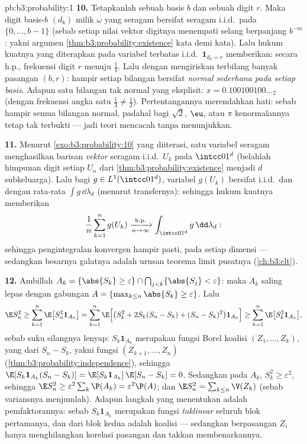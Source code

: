 \begin{solution}{pb:b3:probability:1}
\textbf{10.} Tetapkanlah sebuah basis $b$ dan sebuah digit $r$. Maka digit
basis-$b$ $(d_k)$ milik $\omega$ yang seragam bersifat seragam i.i.d.\ pada
$\{0, \dots, b-1\}$ (sebab setiap nilai vektor digitnya menempati
selang berpanjang $b^{-m}$: yakni argumen
\cref{thm:b3:probability:existence} kata demi kata). Lalu hukum
kuatnya yang diterapkan pada variabel terbatas i.i.d.\ $\mathbf
1_{d_k = r}$ memberikan: secara h.p., frekuensi digit $r$
menuju $\frac1b$. Lalu dengan mengiriskan terbilang banyak
pasangan $(b, r)$: hampir setiap bilangan bersifat
\emph{normal sederhana pada setiap basis}. Adapun satu bilangan tak normal
yang eksplisit: $x = 0.100100100\ldots_2$ (dengan frekuensi angka satu
$\frac13 \neq \frac12$). Pertentangannya merendahkan hati: sebab hampir
semua bilangan normal, padahal bagi $\sqrt2$, $\eu$, atau $\pi$
kenormalannya tetap tak terbukti --- jadi teori  mencacah
tanpa menunjukkan.

\textbf{11.} Menurut \cref{exo:b3:probability:10} yang diiterasi, satu
variabel seragam menghasilkan barisan \emph{vektor} seragam
i.i.d.\ $U_k$ pada $\intcc01^d$ (belahlah himpunan
digit setiap $U_n$ dari
\cref{thm:b3:probability:existence} menjadi $d$ subkeluarga).
Lalu bagi $g \in L^1(\intcc01^d)$, variabel $g(U_k)$ bersifat
i.i.d.\ dan  dengan rata-rata $\int g\,\dd\lambda_d$
(menurut transfernya): sehingga hukum kuatnya memberikan
\[
\frac1n\sum_{k=1}^ng(U_k)
\xrightarrow[n\to\infty]{\text{h.p.}}
\int_{\intcc01^d}g\,\dd\lambda_d :
\]
sehingga pengintegralan  konvergen hampir pasti, pada setiap
dimensi --- sedangkan besarnya galatnya adalah urusan teorema
limit pusatnya (\cref{ch:b3:clt}).

\textbf{12.} Ambillah $A_k = \{\abs{S_k} \geq \varepsilon\} \cap
\bigcap_{j<k}\{\abs{S_j} < \varepsilon\}$: maka $A_k$ saling
lepas dengan gabungan $A = \{\max_{k\leq n}\abs{S_k} \geq
\varepsilon\}$. Lalu
\[
\E S_n^2 \geq \sum_{k=1}^n\E\bigl[S_n^2\mathbf 1_{A_k}\bigr]
= \sum_{k=1}^n\E\Bigl[\bigl(S_k^2 + 2S_k(S_n - S_k) + (S_n
- S_k)^2\bigr)\mathbf 1_{A_k}\Bigr]
\geq \sum_{k=1}^n\E\bigl[S_k^2\mathbf 1_{A_k}\bigr],
\]
sebab suku silangnya lenyap: $S_k\mathbf 1_{A_k}$ merupakan
fungsi Borel koalisi $(Z_1, \dots, Z_k)$, yang
 dari $S_n - S_k$, yakni fungsi $(Z_{k+1},
\dots, Z_n)$ (\cref{thm:b3:probability:independence}), sehingga
$\E[S_k\mathbf 1_{A_k}(S_n - S_k)] = \E[S_k\mathbf
1_{A_k}]\,\E[S_n - S_k] = 0$. Sedangkan pada $A_k$, $S_k^2 \geq
\varepsilon^2$, sehingga $\E S_n^2 \geq
\varepsilon^2\sum_k\P(A_k) = \varepsilon^2\P(A)$; dan $\E
S_n^2 = \sum_{k\leq n}\V(Z_k)$ (sebab variansnya menjumlah). Adapun
langkah yang menentukan adalah pemfaktorannya: sebab $S_k\mathbf 1_{A_k}$ merupakan
fungsi \emph{taklinear} seluruh blok pertamanya, dan
 dari blok kedua adalah  koalisi ---
sedangkan  berpasangan $Z_i$ hanya
menghilangkan korelasi pasangan dan takkan membenarkannya.


\end{solution}
